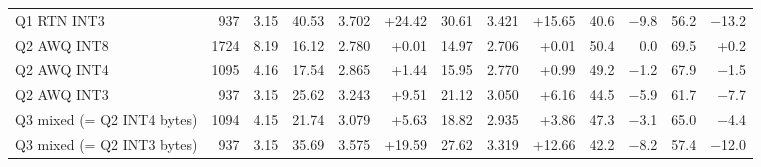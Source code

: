 \begin{adjustbox}{max width=\linewidth}
\begin{tabular}{lrrrrrrrrrrrr}
Q1 RTN INT3 & 937 & 3.15 & 40.53 & 3.702 & +24.42 & 30.61 & 3.421 & +15.65 & 40.6 & $-$9.8 & 56.2 & $-$13.2 \\
Q2 AWQ INT8 & 1724 & 8.19 & 16.12 & 2.780 & +0.01 & 14.97 & 2.706 & +0.01 & 50.4 & 0.0 & 69.5 & +0.2 \\
Q2 AWQ INT4 & 1095 & 4.16 & 17.54 & 2.865 & +1.44 & 15.95 & 2.770 & +0.99 & 49.2 & $-$1.2 & 67.9 & $-$1.5 \\
Q2 AWQ INT3 & 937 & 3.15 & 25.62 & 3.243 & +9.51 & 21.12 & 3.050 & +6.16 & 44.5 & $-$5.9 & 61.7 & $-$7.7 \\
Q3 mixed (= Q2 INT4 bytes) & 1094 & 4.15 & 21.74 & 3.079 & +5.63 & 18.82 & 2.935 & +3.86 & 47.3 & $-$3.1 & 65.0 & $-$4.4 \\
Q3 mixed (= Q2 INT3 bytes) & 937 & 3.15 & 35.69 & 3.575 & +19.59 & 27.62 & 3.319 & +12.66 & 42.2 & $-$8.2 & 57.4 & $-$12.0 \\
\bottomrule
\end{tabular}
\end{adjustbox}
